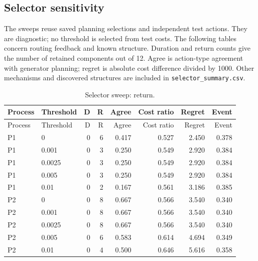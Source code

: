 \subsection{Selector sensitivity}

The sweeps reuse saved planning selections and independent test actions. They are diagnostic; no threshold is selected from test costs. The following tables concern routing feedback and known structure. Duration and return counts give the number of retained components out of 12. Agree is action-type agreement with generator planning; regret is absolute cost difference divided by 1000. Other mechanisms and discovered structures are included in \texttt{selector\_summary.csv}.

\begingroup\small\setlength{\tabcolsep}{3pt}\begin{longtable}{llrrrrrr}\caption{Selector sweep: return.}\\\toprule

Process & Threshold & D & R & Agree & Cost ratio & Regret & Event\\\midrule\endfirsthead

\toprule Process & Threshold & D & R & Agree & Cost ratio & Regret & Event\\\midrule\endhead

P1 & 0 & 0 & 6 & 0.417 & 0.527 & 2.450 & 0.378\\

P1 & 0.001 & 0 & 3 & 0.250 & 0.549 & 2.920 & 0.384\\

P1 & 0.0025 & 0 & 3 & 0.250 & 0.549 & 2.920 & 0.384\\

P1 & 0.005 & 0 & 3 & 0.250 & 0.549 & 2.920 & 0.384\\

P1 & 0.01 & 0 & 2 & 0.167 & 0.561 & 3.186 & 0.385\\

P2 & 0 & 0 & 8 & 0.667 & 0.566 & 3.540 & 0.340\\

P2 & 0.001 & 0 & 8 & 0.667 & 0.566 & 3.540 & 0.340\\

P2 & 0.0025 & 0 & 8 & 0.667 & 0.566 & 3.540 & 0.340\\

P2 & 0.005 & 0 & 6 & 0.583 & 0.614 & 4.694 & 0.349\\

P2 & 0.01 & 0 & 4 & 0.500 & 0.646 & 5.616 & 0.358\\


\end{longtable}
